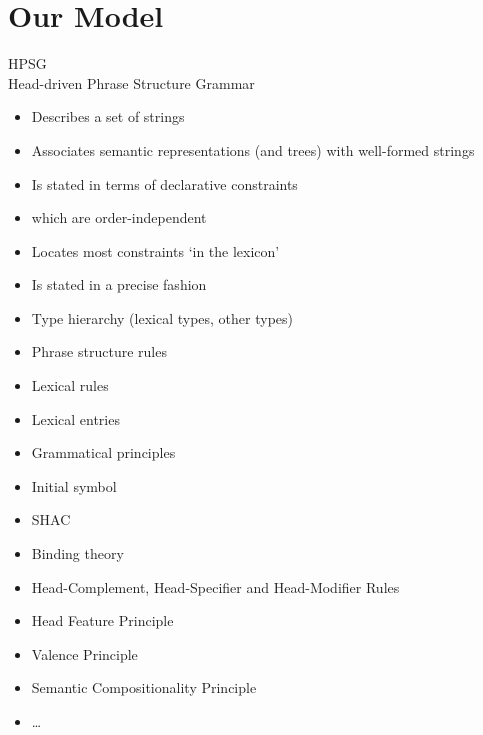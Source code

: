 \documentclass[a4paper,landscape,headrule,footrule]{foils}
\begin{document}
\maketitle

\overview

\section[Our model: parts, universals and design goals]{Our Model}

\begin{center}
  \LARGE HPSG \\
  \Large Head-driven Phrase Structure Grammar  
\end{center}

\begin{itemize}
\item Describes a set of strings
\item Associates semantic representations (and
trees) with well-formed strings
\item Is stated in terms of declarative constraints
\item[\ldots]  which are order-independent
\item Locates most constraints `in the lexicon'
\item Is stated in a precise fashion
\end{itemize}


\begin{itemize}
\item Type hierarchy (lexical types, other types)
\item Phrase structure rules
\item Lexical rules
\item Lexical entries
\item Grammatical principles
\item Initial symbol
\end{itemize}


\begin{itemize}
\item SHAC
\item Binding theory
\item Head-Complement, Head-Specifier and Head-Modifier Rules
\item Head Feature Principle
\item Valence Principle
\item Semantic Compositionality Principle
\item \ldots 
\end{itemize}
\end{document}

